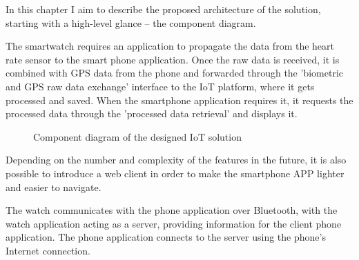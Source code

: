 In this chapter I aim to describe the proposed architecture of the solution, starting with a high-level glance -- the component diagram.

The smartwatch requires an application to propagate the data from the heart rate sensor to the smart phone application.
Once the raw data is received, it is combined with GPS data from the phone and forwarded through the 'biometric and GPS raw data exchange' interface to the IoT platform, where it gets processed and saved.
When the smartphone application requires it, it requests the processed data through the 'processed data retrieval' and displays it.

\begin{figure}[h]
    \caption{Component diagram of the designed IoT solution}
\end{figure}

Depending on the number and complexity of the features in the future, it is also possible to introduce a web client in order to make the smartphone APP lighter and easier to navigate.

The watch communicates with the phone application over Bluetooth, with the watch application acting as a server, providing information for the client phone application.
The phone application connects to the server using the phone's Internet connection.

